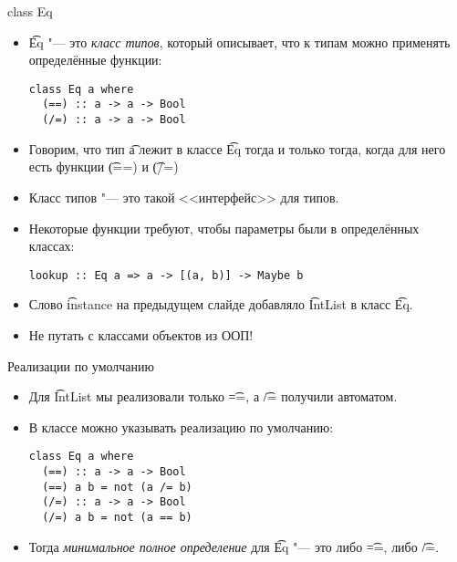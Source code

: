\begin{frame}[fragile]{class Eq}
	\begin{itemize}
		\item \t{Eq} "--- это \textit{класс типов}, который описывает, что к типам можно применять определённые функции:
\begin{verbatim}
class Eq a where
  (==) :: a -> a -> Bool
  (/=) :: a -> a -> Bool
\end{verbatim}
		\item Говорим, что тип \t{a} лежит в классе \t{Eq} тогда и только тогда, когда для него есть функции \t{(==)} и \t{(/=)}
		\item Класс типов "--- это такой <<интерфейс>> для типов.
		\item Некоторые функции требуют, чтобы параметры были в определённых классах:
\begin{verbatim}
lookup :: Eq a => a -> [(a, b)] -> Maybe b
\end{verbatim}
		\item Слово \t{instance} на предыдущем слайде добавляло \t{IntList} в класс \t{Eq}.
		\item Не путать с классами объектов из ООП!
	\end{itemize}
\end{frame}

\begin{frame}[fragile]{Реализации по умолчанию}
	\begin{itemize}
		\item Для \t{IntList} мы реализовали только \t{==}, а \t{/=} получили автоматом.
		\item В классе можно указывать реализацию по умолчанию:
\begin{verbatim}
class Eq a where
  (==) :: a -> a -> Bool
  (==) a b = not (a /= b)
  (/=) :: a -> a -> Bool
  (/=) a b = not (a == b)
\end{verbatim}
		\item Тогда \textit{минимальное полное определение} для \t{Eq} "--- это либо \t{==}, либо \t{/=}.
	\end{itemize}
\end{frame}

